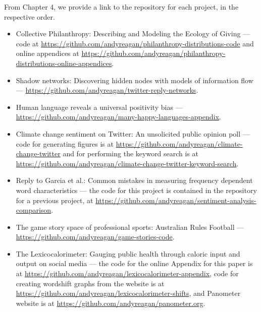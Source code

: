 From Chapter 4, we provide a link to the repository for each project, in the respective order.

\begin{itemize}
\item Collective Philanthropy: Describing and Modeling the Ecology of Giving --- code at \href{https://github.com/andyreagan/philanthropy-distributions-code}{https://github.com/andyreagan/philanthropy-distributions-code} and online appendices at \href{https://github.com/andyreagan/philanthropy-distributions-online-appendices}{https://github.com/andyreagan/philanthropy-distributions-online-appendices}.
\item Shadow networks: Discovering hidden nodes with models of information flow --- \href{https://github.com/andyreagan/twitter-reply-networks}{https://github.com/andyreagan/twitter-reply-networks}.
\item Human language reveals a universal positivity bias --- \href{https://github.com/andyreagan/many-happy-languages-appendix}{https://github.com/andyreagan/many-happy-languages-appendix}.
\item Climate change sentiment on Twitter: An unsolicited public opinion poll --- code for generating figures is at \href{https://github.com/andyreagan/climate-change-twitter}{https://github.com/andyreagan/climate-change-twitter} and for performing the keyword search is at \href{https://github.com/andyreagan/climate-change-twitter-keyword-search}{https://github.com/andyreagan/climate-change-twitter-keyword-search}.
\item Reply to Garcia et al.: Common mistakes in measuring frequency dependent word characteristics --- the code for this project is contained in the repository for a previous project, at \href{https://github.com/andyreagan/sentiment-analysis-comparison}{https://github.com/andyreagan/sentiment-analysis-comparison}.
\item The game story space of professional sports: Australian Rules Football --- \href{https://github.com/andyreagan/game-stories-code}{https://github.com/andyreagan/game-stories-code}.
\item The Lexicocalorimeter: Gauging public health through caloric input and output on social media --- the code for the online Appendix for this paper is at \href{https://github.com/andyreagan/lexicocalorimeter-appendix}{https://github.com/andyreagan/lexicocalorimeter-appendix}, code for creating wordshift graphs from the website is at \href{https://github.com/andyreagan/lexicocalorimeter-shifts}{https://github.com/andyreagan/lexicocalorimeter-shifts}, and Panometer website is at \href{https://github.com/andyreagan/panometer.org}{https://github.com/andyreagan/panometer.org}.

\end{itemize}
